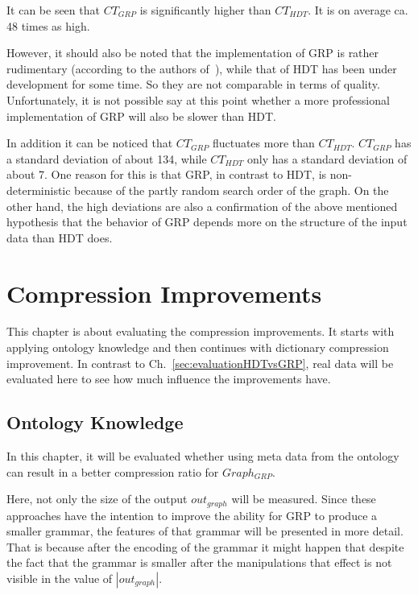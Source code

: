 It can be seen that $CT_{GRP}$ is significantly higher than $CT_{HDT}$. It is on average ca. 48 times as high.

However, it should also be noted that the implementation of GRP is rather rudimentary  (according to the authors of~\cite{maneth}), while that of HDT has been under development for some time. So they are not comparable in terms of quality. Unfortunately, it is not possible say at this point whether a more professional implementation of GRP will also be slower than HDT.

In addition it can be noticed that $CT_{GRP}$ fluctuates more than $CT_{HDT}$. $CT_{GRP}$ has a standard deviation of about 134, while $CT_{HDT}$ only has a standard deviation of about 7. One reason for this is that GRP, in contrast to HDT, is non-deterministic because of the partly random search order of the graph. On the other hand, the high deviations are also a confirmation of the above mentioned hypothesis that the behavior of GRP depends more on the structure of the input data than HDT does.



\section{Compression Improvements}

This chapter is about evaluating the compression improvements. It starts with applying ontology knowledge and then continues with dictionary compression improvement. In contrast to Ch.~\ref{sec:evaluationHDTvsGRP}, real data will be evaluated here to see how much influence the improvements have.

\subsection{Ontology Knowledge}\label{sec:evaluationOntKnowledge}

In this chapter, it will be evaluated whether using meta data from the ontology can result in a better compression ratio for $Graph_{GRP}$. 

Here, not only the size of the output $out_{graph}$ will be measured. Since these approaches have the intention to improve the ability for GRP to produce a smaller grammar, the features of that grammar will be presented in more detail. That is because after the encoding of the grammar it might happen that despite the fact that the grammar is smaller after the manipulations that effect is not visible in the value of $|out_{graph}|$. 

